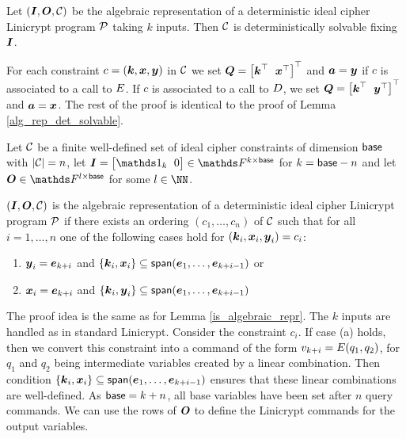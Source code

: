 \begin{lemma}
\label{alg_rep_det_solvable_ic}
    Let $(\I, \O, \C)$ be the algebraic representation of a deterministic ideal cipher Linicrypt program $\P$ taking $k$ inputs.
    Then $\C$ is deterministically solvable fixing $\I$.
\end{lemma}

\begin{sketch}
    For each constraint $c = (\vk, \vx, \vy)$ in $\C$ we set $\Q = \m{\vk^\top & \vx^\top}^\top$ and $\va = \vy$ if $c$ is associated to a call to $\E$.
    If $c$ is associated to a call to $\D$,
    we set $\Q = \m{\vk^\top & \vy^\top}^\top$ and $\va = \vx$.
    The rest of the proof is identical to the proof of Lemma \ref{alg_rep_det_solvable}.
\end{sketch}

\begin{lemma}
\label{is_algebraic_repr_ic}
    Let $\C$ be a finite well-defined set of ideal cipher constraints of dimension $\base$ with $|\C| = n$,
    let $\I = \m{\Id_k & 0} \in \F^{k\times\base}$ for $k = \base - n$
    and let $\O \in \F^{l \times \base}$ for some $l \in \NN$.
       
    $(\I, \O, \C)$ is the algebraic representation of a deterministic ideal cipher Linicrypt program $\P$
    if there exists an ordering $(c_1, \dots, c_n)$ of $\C$
    such that for all $i=1, \dots, n$ one of the following cases hold for $(\vk_i, \vx_i, \vy_i) = c_i$:
    \begin{enumerate}[label=(\alph*)]
    \item
    $\vy_i = \ve_{k+i}$ and $\{\vk_i, \vx_i\} \subseteq \spn(\dts \ve {k+i-1})$ or
    \item
    $\vx_i = \ve_{k+i}$ and $\{\vk_i, \vy_i\} \subseteq \spn(\dts \ve {k+i-1})$
    \end{enumerate}
\end{lemma}

\begin{sketch}
    The proof idea is the same as for Lemma \ref{is_algebraic_repr}.
    The $k$ inputs are handled as in standard Linicrypt.
    Consider the constraint $c_i$.
    If case (a) holds, then we convert this constraint into a command of the form $v_{k+i} = \E(q_1, q_2)$,
    for $q_1$ and $q_2$ being intermediate variables created by a linear combination.
    Then condition $\{\vk_i, \vx_i\} \subseteq \spn(\dts \ve {k+i-1})$ ensures that these linear combinations are well-defined.
    As $\base = k + n$, all base variables have been set after $n$ query commands.
    We can use the rows of $\O$ to define the Linicrypt commands for the output variables.
\end{sketch}

